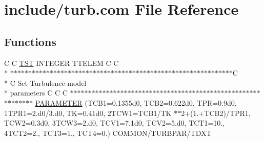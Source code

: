 \hypertarget{turb_8com}{\section{include/turb.com File Reference}
\label{turb_8com}
}
\subsection*{Functions}
\begin{DoxyCompactItemize}
\item 
C C \hyperlink{turb_8com_a677fc6bb107acfd381357f761464b300}{T\-S\-T} I\-N\-T\-E\-G\-E\-R T\-T\-E\-L\-E\-M C C \\*
$\ast$$\ast$$\ast$$\ast$$\ast$$\ast$$\ast$$\ast$$\ast$$\ast$$\ast$$\ast$$\ast$$\ast$$\ast$$\ast$$\ast$$\ast$$\ast$$\ast$$\ast$$\ast$$\ast$$\ast$$\ast$$\ast$$\ast$$\ast$$\ast$$\ast$$\ast$$\ast$$\ast$$\ast$$\ast$$\ast$$\ast$$\ast$$\ast$$\ast$$\ast$$\ast$$\ast$$\ast$$\ast$$\ast$$\ast$$\ast$$\ast$$\ast$$\ast$$\ast$$\ast$$\ast$$\ast$$\ast$$\ast$$\ast$$\ast$$\ast$$\ast$$\ast$C \\*
C Set Turbulence model \\*
parameters C C C $\ast$$\ast$$\ast$$\ast$$\ast$$\ast$$\ast$$\ast$$\ast$$\ast$$\ast$$\ast$$\ast$$\ast$$\ast$$\ast$$\ast$$\ast$$\ast$$\ast$$\ast$$\ast$$\ast$$\ast$$\ast$$\ast$$\ast$$\ast$$\ast$$\ast$$\ast$$\ast$$\ast$$\ast$$\ast$$\ast$$\ast$$\ast$$\ast$$\ast$$\ast$$\ast$$\ast$$\ast$$\ast$$\ast$$\ast$$\ast$$\ast$$\ast$$\ast$$\ast$$\ast$$\ast$$\ast$$\ast$$\ast$$\ast$$\ast$$\ast$$\ast$ \hyperlink{turb_8com_a389bbfe938bae9bde27ca4e66428f7d1}{P\-A\-R\-A\-M\-E\-T\-E\-R} (T\-C\-B1=0.\-1355d0, T\-C\-B2=0.\-622d0, T\-P\-R=0.\-9d0, 1\-T\-P\-R1=2.\-d0/3.\-d0, T\-K=0.\-41d0, 2\-T\-C\-W1=\-T\-C\-B1/\-T\-K $\ast$$\ast$2+(1.+\-T\-C\-B2)/\-T\-P\-R1, T\-C\-W2=0.\-3d0, 3\-T\-C\-W3=2.\-d0, T\-C\-V1=7.\-1d0, T\-C\-V2=5.\-d0, T\-C\-T1=10., 4\-T\-C\-T2=2., T\-C\-T3=1., T\-C\-T4=0.) C\-O\-M\-M\-O\-N/\-T\-U\-R\-B\-P\-A\-R/\-T\-D\-X\-T
\end{DoxyCompactItemize}
